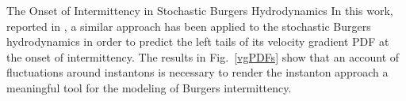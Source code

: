 \begin{chapter}{The Onset of Intermittency in Stochastic Burgers Hydrodynamics}
In this work, reported in \textcite{apolinario2019onset}, a similar approach has been applied to the stochastic Burgers hydrodynamics in order to predict the left tails of its velocity gradient PDF at the onset of intermittency. The results in Fig.~\ref{vgPDFs} show that an account of fluctuations around instantons is necessary to render the instanton approach a meaningful tool for the modeling of Burgers intermittency.

\end{chapter}
